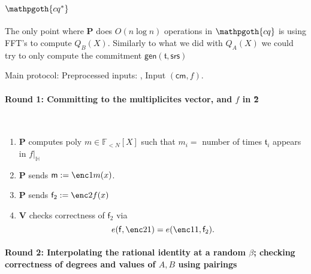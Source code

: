\documentclass[11pt]{article} %
\newcommand{\cq}{\ensuremath{\mathpgoth{cq} }\xspace}
\newcommand{\cqstar}{\ensuremath{\mathpgoth{cq^{\mathbf{*}} }}\xspace}
\newcommand{\F}{\ensuremath{\mathbb F}\xspace}
\newcommand{\srs}{\ensuremath{\mathsf{srs}}\xspace}
\newcommand{\cm}{\ensuremath{\mathsf{cm}}\xspace}
\newcommand{\defeq}{:=}
\newcommand{\gen}{\ensuremath{\mathsf{gen}}\xspace}
\newcommand{\prv}{\ensuremath{\mathsf{\mathbf{P}}}\xspace}
\newcommand{\ver}{\ensuremath{\mathsf{\mathbf{V}}}\xspace}
\newcommand{\polysofdeg}[1]{\ensuremath{\F_{< #1}[X]}\xspace}
\newcommand{\restricttoset}[2]{\ensuremath{#1|_{#2}}\xspace}
\newcommand{\subspace}{\ensuremath{\mathbb{H}}\xspace}
\newcommand{\bigspace}{\ensuremath{\mathbb{V}}\xspace}
\newcommand{\witsize}{\ensuremath{n}\xspace}
\newcommand{\witruntime}{\ensuremath{\witsize\log\witsize}\xspace}
\newcommand{\tabsize}{\ensuremath{N}\xspace}
\newcommand{\tab}{\ensuremath{\mathfrak{t}}\xspace}
\newcommand{\f}{\ensuremath{\mathsf{f}}\xspace}
\newcommand{\ftwo}{\ensuremath{\mathsf{f}_2}\xspace}
\newcommand{\m}{\ensuremath{\mathsf{m}}\xspace}
\begin{document}
\section{\cqstar}
The only point where \prv does $O(\witruntime)$ operations in \cq is using FFT's to compute $Q_B(X)$. Similarly to what we did with $Q_A(X)$ we could 
try to only compute the commitment 
$\gen(\tab,\srs)$

Main protocol:
Preprocessed inputs:
\enc2{Z_\bigspace(x)}, 
Input $(\cm,f)$.
	\paragraph{\textbf{Round 1:} Committing to the multiplicites vector, and $f$ in \G2} \ \\
\begin{enumerate}
 \item \prv computes poly $m\in \polysofdeg{\tabsize}$ such that $m_i=$ number of times $\tab_i$ appears in \restricttoset{f}{\subspace}
 \item \prv sends $\m\defeq \enc1{m(x)}$.
 \item \prv sends $\ftwo \defeq \enc2{f(x)}$
 \item \ver checks correctness of \ftwo via
 \[e(\f,\enc2{1})=e(\enc1{1},\ftwo).\]
 \end{enumerate}
	\paragraph{\textbf{Round 2:} Interpolating the rational identity at a random $\beta$; checking correctness of degrees and values of  $A,B$ using pairings} \ \\
 
\end{document}
